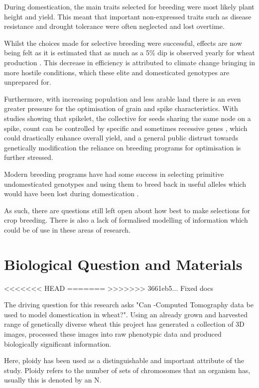 \documentclass[11pt]{report}
\begin{document}
During domestication, the main traits selected for breeding were most likely plant height and yield. This meant that important non-expressed traits such as disease resistance and drought tolerance were often neglected and lost overtime.

Whilst the choices made for selective breeding were successful, effects are now being felt as it is estimated that as much as a 5\% dip is observed yearly for  wheat production \cite{Shiferaw2013}. This decrease in efficiency is attributed to climate change bringing in more hostile conditions, which these elite and  domesticated genotypes are unprepared for.

Furthermore, with increasing population and less arable land there is an even greater pressure for the optimisation of grain and spike characteristics. With studies showing that spikelet, the collective for seeds sharing the same node on a spike, count can be controlled by specific and sometimes recessive genes \cite{Finnegan2018}, which could drastically enhance overall yield, and a general public distrust towards genetically modification \cite{Aleksejeva2014,Twardowski2015,Lynas} the reliance on breeding programs for optimisation is further stressed.

Modern breeding programs have had some success in selecting primitive undomesticated genotypes and using them to breed back in useful alleles which would have been lost during domestication \cite{Charmet2011}.

As such, there are questions still left open about how best to make selections for crop breeding. There is also a lack of formalised modelling of information which could be of use in these areas of research.

\section{Biological Question and Materials}
<<<<<<< HEAD
\label{sec:org37783fa}
=======
\label{sec:org43603e9}
>>>>>>> 3661eb5... Fixed docs

The driving question for this research asks "Can \textmu{}-Computed Tomography data be used to model domestication in wheat?". Using an already grown and harvested range of genetically diverse wheat this project has generated a collection of 3D images, processed these images into raw phenotypic data and produced biologically significant information.

Here, ploidy has been used as a distinguishable and important attribute of the study. Ploidy refers to the number of sets of chromosomes that an organism has, usually this is denoted by an N.
\end{document}

